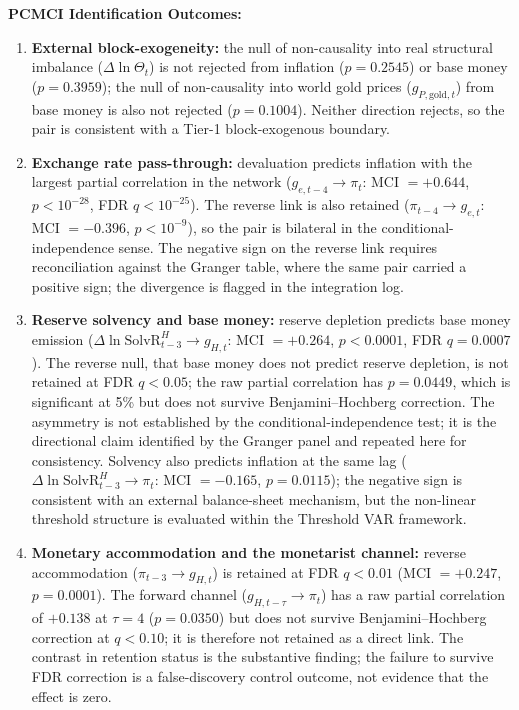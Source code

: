 \smallskip
\noindent\textbf{PCMCI Identification Outcomes:}
\begin{enumerate}
	\small
	\setlength{\itemsep}{0.02em}
	\setlength{\topsep}{0.1em}
	\setlength{\partopsep}{0pt}
	\setlength{\parsep}{0pt}
	\setlength{\parskip}{0pt}
	\item \textbf{External block-exogeneity:} the null of non-causality into real structural imbalance ($\Delta \ln \Theta_t$) is not rejected from inflation ($p = 0.2545$) or base money ($p = 0.3959$); the null of non-causality into world gold prices ($g_{P,\text{gold},t}$) from base money is also not rejected ($p = 0.1004$). Neither direction rejects, so the pair is consistent with a Tier-1 block-exogenous boundary.
	\item \textbf{Exchange rate pass-through:} devaluation predicts inflation with the largest partial correlation in the network ($g_{e,t-4} \to \pi_t$: MCI $= +0.644$, $p < 10^{-28}$, FDR $q < 10^{-25}$). The reverse link is also retained ($\pi_{t-4} \to g_{e,t}$: MCI $= -0.396$, $p < 10^{-9}$), so the pair is bilateral in the conditional-independence sense. The negative sign on the reverse link requires reconciliation against the Granger table, where the same pair carried a positive sign; the divergence is flagged in the integration log.
	\item \textbf{Reserve solvency and base money:} reserve depletion predicts base money emission ($\Delta \ln \text{SolvR}_{t-3}^H \to g_{H,t}$: MCI $= +0.264$, $p < 0.0001$, FDR $q = 0.0007$). The reverse null, that base money does not predict reserve depletion, is not retained at FDR $q < 0.05$; the raw partial correlation has $p = 0.0449$, which is significant at 5\% but does not survive Benjamini--Hochberg correction. The asymmetry is not established by the conditional-independence test; it is the directional claim identified by the Granger panel and repeated here for consistency. Solvency also predicts inflation at the same lag ($\Delta \ln \text{SolvR}_{t-3}^H \to \pi_t$: MCI $= -0.165$, $p = 0.0115$); the negative sign is consistent with an external balance-sheet mechanism, but the non-linear threshold structure is evaluated within the Threshold VAR framework.
	\item \textbf{Monetary accommodation and the monetarist channel:} reverse accommodation ($\pi_{t-3} \to g_{H,t}$) is retained at FDR $q < 0.01$ (MCI $= +0.247$, $p = 0.0001$). The forward channel ($g_{H,t-\tau} \to \pi_t$) has a raw partial correlation of $+0.138$ at $\tau = 4$ ($p = 0.0350$) but does not survive Benjamini--Hochberg correction at $q < 0.10$; it is therefore not retained as a direct link. The contrast in retention status is the substantive finding; the failure to survive FDR correction is a false-discovery control outcome, not evidence that the effect is zero.

\end{enumerate}
